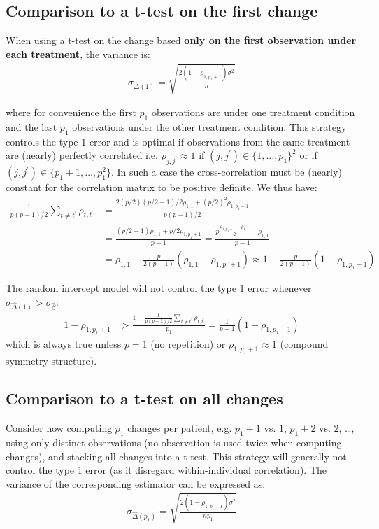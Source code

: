 \documentclass[12pt]{article}
\begin{document}
\subsection{Comparison to a t-test on the first change}
\label{sec:orge899ec4}

When using a t-test on the change based \textbf{only on the first observation
under each treatment}, the variance is:
\begin{align*}
\sigma_{\widehat{\Delta}(1)} = \sqrt{\frac{2(1-\rho_{1,p_1+1}) \sigma^2}{n}}
\end{align*}

where for convenience the first \(p_1\) observations are under one
treatment condition and the last \(p_1\) observations under the other
treatment condition. This strategy controls the type 1 error and is
optimal if observations from the same treatment are (nearly) perfectly
correlated i.e. \(\rho_{j,j^{\prime}} \approx 1\) if
\((j,j^{\prime})\in \{1,\ldots,p_1\}^2\) or if \((j,j^{\prime})\in
\{p_1+1,\ldots,p_1^2\}\). In such a case the cross-correlation must be
(nearly) constant for the correlation matrix to be positive
definite. We thus have:
\begin{align*}
\frac{1}{p(p-1)/2}\sum_{t \neq t^{\prime}} \rho_{t,t^{\prime}} &= \frac{2(p/2)(p/2-1)/2 \rho_{1,1} +(p/2)^2 \rho_{1,p_1+1}}{p(p-1)/2} \\
&= \frac{(p/2-1)\rho_{1,1}+p/2 \rho_{1,p_1+1}}{p-1} = \frac{p\frac{\rho_{1,p_1+1}+\rho_{1,1}}{2} - \rho_{1,1}}{p-1} \\
&= \rho_{1,1} - \frac{p}{2(p-1)}(\rho_{1,1}-\rho_{1,p_1+1}) \approx 1 - \frac{p}{2(p-1)}(1-\rho_{1,p_1+1})
\end{align*}


\noindent The random intercept model will not control the type 1 error
whenever \(\sigma_{\widehat{\Delta}(1)}>\sigma_{\widehat{\beta}}\):
\begin{align*}
1-\rho_{1,p_1+1} &> \frac{1-\frac{1}{p(p-1)/2}\sum_{t \neq t^{\prime}} \rho_{t,t^{\prime}}}{p_1} = \frac{1}{p-1}(1-\rho_{1,p_1+1})
\end{align*}
which is always true unless \(p=1\) (no repetition) or \(\rho_{1,p_1+1}\approx 1\) (compound symmetry structure).

\subsection{Comparison to a t-test on all changes}
\label{sec:orgea21d77}

Consider now computing \(p_1\) changes per patient, e.g. \(p_1+1\)
vs. \(1\), \(p_1+2\) vs. \(2\), \ldots, using only distinct
observations (no observation is used twice when computing changes),
and stacking all changes into a t-test. This strategy will generally
not control the type 1 error (as it disregard within-individual
correlation). The variance of the corresponding estimator can be
expressed as:
\begin{align*}
\sigma_{\widehat{\Delta}(p_1)} = \sqrt{\frac{2(1-\rho_{1,p_1+1}) \sigma^2}{np_1}}
\end{align*}
\end{document}
